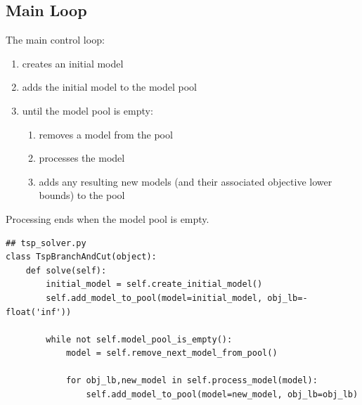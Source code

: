 \documentclass{article}
\begin{document}
\subsection{Main Loop}
\begin{flushleft}

The main control loop:

\begin{enumerate}
\item creates an initial model
\item adds the initial model to the model pool
\item until the model pool is empty:
  \begin{enumerate}
  \item removes a model from the pool
  \item processes the model
  \item adds any resulting new models (and their associated objective lower bounds) to the pool
  \end{enumerate}
\end{enumerate}

Processing ends when the model pool is empty.

\begin{lstlisting}
## tsp_solver.py
class TspBranchAndCut(object):
    def solve(self):
        initial_model = self.create_initial_model()
        self.add_model_to_pool(model=initial_model, obj_lb=-float('inf'))

        while not self.model_pool_is_empty():
            model = self.remove_next_model_from_pool()

            for obj_lb,new_model in self.process_model(model):
                self.add_model_to_pool(model=new_model, obj_lb=obj_lb)
\end{lstlisting}

\end{flushleft}
\end{document}
